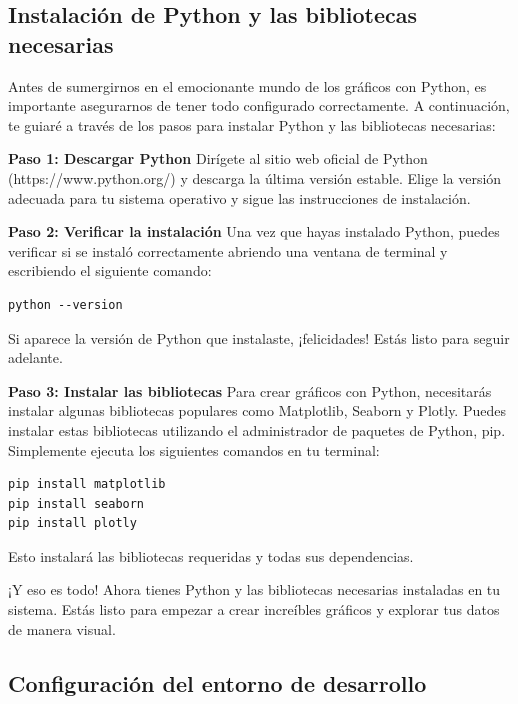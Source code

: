 \documentclass[
  a4paper,
]{article}
\begin{document}
\hypertarget{instalaciuxf3n-de-python-y-las-bibliotecas-necesarias}{%
\subsection{Instalación de Python y las bibliotecas
necesarias}\label{instalaciuxf3n-de-python-y-las-bibliotecas-necesarias}}

Antes de sumergirnos en el emocionante mundo de los gráficos con Python,
es importante asegurarnos de tener todo configurado correctamente. A
continuación, te guiaré a través de los pasos para instalar Python y las
bibliotecas necesarias:

\textbf{Paso 1: Descargar Python} Dirígete al sitio web oficial de
Python (https://www.python.org/) y descarga la última versión estable.
Elige la versión adecuada para tu sistema operativo y sigue las
instrucciones de instalación.

\textbf{Paso 2: Verificar la instalación} Una vez que hayas instalado
Python, puedes verificar si se instaló correctamente abriendo una
ventana de terminal y escribiendo el siguiente comando:

\begin{verbatim}
python --version
\end{verbatim}

Si aparece la versión de Python que instalaste, ¡felicidades! Estás
listo para seguir adelante.

\textbf{Paso 3: Instalar las bibliotecas} Para crear gráficos con
Python, necesitarás instalar algunas bibliotecas populares como
Matplotlib, Seaborn y Plotly. Puedes instalar estas bibliotecas
utilizando el administrador de paquetes de Python, pip. Simplemente
ejecuta los siguientes comandos en tu terminal:

\begin{verbatim}
pip install matplotlib
pip install seaborn
pip install plotly
\end{verbatim}

Esto instalará las bibliotecas requeridas y todas sus dependencias.

¡Y eso es todo! Ahora tienes Python y las bibliotecas necesarias
instaladas en tu sistema. Estás listo para empezar a crear increíbles
gráficos y explorar tus datos de manera visual.

\hypertarget{configuraciuxf3n-del-entorno-de-desarrollo}{%
\subsection{Configuración del entorno de
desarrollo}\label{configuraciuxf3n-del-entorno-de-desarrollo}}
\end{document}
